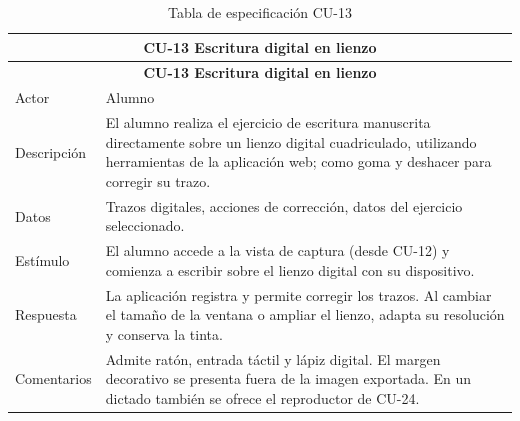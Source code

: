 \begin{longtable}{|p{4cm}|p{11cm}|}
\caption{Tabla de especificación CU-13}
\label{tab:cu13} \\

\hline
\multicolumn{2}{|c|}{\textbf{CU-13 Escritura digital en lienzo}} \\
\hline
\endfirsthead

\hline
\multicolumn{2}{|c|}{\textbf{CU-13 Escritura digital en lienzo}} \\
\hline
\endhead

\hline
\endfoot
\endlastfoot

Actor & Alumno \\
\hline

Descripción & El alumno realiza el ejercicio de escritura manuscrita directamente sobre un lienzo digital cuadriculado, utilizando herramientas de la aplicación web; como goma y deshacer para corregir su trazo. \\
\hline

Datos & Trazos digitales, acciones de corrección, datos del ejercicio seleccionado. \\
\hline

Estímulo & El alumno accede a la vista de captura (desde CU-12) y comienza a escribir sobre el lienzo digital con su dispositivo. \\
\hline

Respuesta & La aplicación registra y permite corregir los trazos. Al cambiar el tamaño de la ventana o ampliar el lienzo, adapta su resolución y conserva la tinta. \\
\hline

Comentarios & Admite ratón, entrada táctil y lápiz digital. El margen decorativo se presenta fuera de la imagen exportada. En un dictado también se ofrece el reproductor de CU-24. \\
\hline

\end{longtable}



